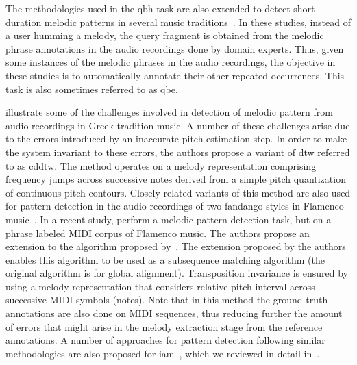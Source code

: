 The methodologies used in the \gls{qbh} task are also extended to detect short-duration melodic patterns in several music traditions~\citep{pikrakis2003recognition,pikrakis2012tracking,pikrakis2016detection,Ross2012b,dutta2014modified}. In these studies, instead of a user humming a melody, the query fragment is obtained from the melodic phrase annotations in the audio recordings done by domain experts. Thus, given some instances of the melodic phrases in the audio recordings, the objective in these studies is to automatically annotate their other repeated occurrences. This task is also sometimes referred to as \gls{qbe}.  

\cite{pikrakis2003recognition} illustrate some of the challenges involved in detection of melodic pattern from audio recordings in Greek tradition music. A number of these challenges arise due to the errors introduced by an inaccurate pitch estimation step. In order to make the system invariant to these errors, the authors propose a variant of \gls{dtw} referred to as \gls{cddtw}. The method operates on a melody representation comprising frequency jumps across successive notes derived from a simple pitch quantization of continuous pitch contours. Closely related variants of this method are also used for pattern detection in the audio recordings of two fandango styles in Flamenco music~\citep{pikrakis2012tracking,gomez2012automatic}. In a recent study, \cite{pikrakis2016detection} perform a melodic pattern detection task, but on a phrase labeled MIDI corpus of Flamenco music. The authors propose an extension to the algorithm proposed by~\cite{needleman1970general}. The extension proposed by the authors enables this algorithm to be used as a subsequence matching algorithm (the original algorithm is for global alignment). Transposition invariance is ensured by using a melody representation that considers relative pitch interval across successive MIDI symbols (notes). Note that in this method the ground truth annotations are also done on MIDI sequences, thus reducing further the amount of errors that might arise in the melody extraction stage from the reference annotations. A number of approaches for pattern detection following similar methodologies are also proposed for \gls{iam}~\citep{Ross2012b,dutta2014modified,ganguli2015efficient}, which we reviewed in detail in~. 

